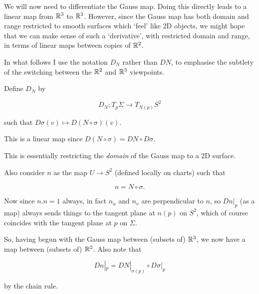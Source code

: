\documentclass[11pt]{scrartcl}
\begin{document}
We will now need to differentiate the Gauss map. Doing this directly leads to a linear map from $\mathbb R^3$ to $\mathbb R^3$. However, since the Gauss map has both domain and range restricted to smooth surfaces which `feel' like 2D objects, we might hope that we can make sense of such a `derivative', with restricted domain and range, in terms of linear maps between copies of $\mathbb R^2$.

In what follows I use the notation $D_N$ rather than $DN$, to emphasise the subtlety of the switching between the $\mathbb R^2$ and $\mathbb R^3$ viewpoints.

Define $D_N$ by 

\begin{equation}
    D_N : T_p \Sigma \to T_{N(p)} S^2
\end{equation}

such that $D\sigma (v) \mapsto D(N \circ \sigma) (v)$.

This is a linear map since $D(N \circ \sigma) = DN \circ D\sigma $. 

\begin{remark}
This is essentially restricting the \textit{domain} of the Gauss map to a 2D surface.
\end{remark}

Also consider $n$ as the map $U \rightarrow S^2$ (defined locally on charts) such that 

\begin{equation}
    n = N \circ \sigma.
\end{equation}

Now since $n . n = 1$ always, in fact $n_u$ and $n_v$ are perpendicular to $n$, so $Dn|_p$ (as a map) always sends things to the tangent plane at $n(p)$ on $S^2$, which of course coincides with the tangent plane at $p$ on $\Sigma$.

So, having begun with the Gauss map between (subsets of) $\mathbb R^3$, we now have a map between (subsets of) $\mathbb R^2$. Also note that

\begin{equation}
    Dn|_p = DN|_{\sigma(p)} \circ D\sigma|_p
\end{equation}

by the chain rule.
\end{document}
